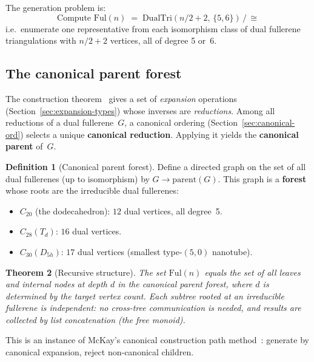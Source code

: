 \documentclass[11pt,a4paper]{article}
\newtheorem{theorem}{Theorem}[section]
\theoremstyle{definition}
\newtheorem{definition}[theorem]{Definition}
\newcommand{\Ful}{\mathrm{Ful}}
\newcommand{\DualTri}{\mathrm{DualTri}}
\begin{document}
The generation problem is:
\[
  \text{Compute } \Ful(n) \;=\; \DualTri(n/2+2,\,\{5,6\})\,\big/\,{\cong}
\]
i.e.\ enumerate one representative from each isomorphism class of dual
fullerene triangulations with $n/2 + 2$ vertices, all of degree 5 or~6.

\subsection{The canonical parent forest}
\label{sec:forest}

The construction theorem~\cite{hasheminezhad_08} gives a set of
\emph{expansion} operations (Section~\ref{sec:expansion-types}) whose
inverses are \emph{reductions}.  Among all reductions of a dual
fullerene~$G$, a canonical ordering (Section~\ref{sec:canonical-ord})
selects a unique \textbf{canonical reduction}.  Applying it yields the
\textbf{canonical parent} of~$G$.

\begin{definition}[Canonical parent forest]
\label{def:forest}
Define a directed graph on the set of all dual fullerenes (up to
isomorphism) by $G \to \mathrm{parent}(G)$.  This graph is a
\textbf{forest} whose roots are the irreducible dual fullerenes:
\begin{itemize}[nosep]
  \item $C_{20}$ (the dodecahedron): $12$ dual vertices, all degree~5.
  \item $C_{28}(T_d)$: $16$ dual vertices.
  \item $C_{30}(D_{5h})$: $17$ dual vertices (smallest type-$(5,0)$ nanotube).
\end{itemize}
\end{definition}

\begin{theorem}[Recursive structure]
\label{thm:recursive}
The set $\Ful(n)$ equals the set of all leaves and internal nodes at
depth $d$ in the canonical parent forest, where $d$ is determined by
the target vertex count.  Each subtree rooted at an irreducible
fullerene is independent: no cross-tree communication is needed, and
results are collected by list concatenation (the free monoid).
\end{theorem}

This is an instance of McKay's canonical construction path
method~\cite{mckay_98}: generate by canonical expansion, reject
non-canonical children.
\end{document}
